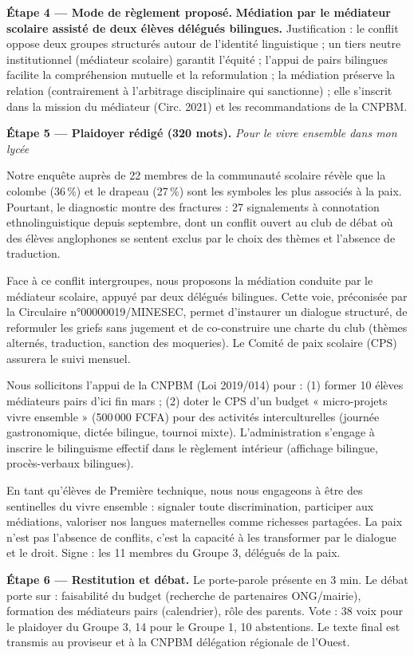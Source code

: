\documentclass[11pt]{article}
\begin{document}
\begin{exoresolu}
\textbf{Étape 4 — Mode de règlement proposé.} \textbf{Médiation par le médiateur scolaire assisté de deux élèves délégués bilingues.} Justification : le conflit oppose deux groupes structurés autour de l'identité linguistique ; un tiers neutre institutionnel (médiateur scolaire) garantit l'équité ; l'appui de pairs bilingues facilite la compréhension mutuelle et la reformulation ; la médiation préserve la relation (contrairement à l'arbitrage disciplinaire qui sanctionne) ; elle s'inscrit dans la mission du médiateur (Circ. 2021) et les recommandations de la CNPBM.

\textbf{Étape 5 — Plaidoyer rédigé (320 mots).}
\emph{Pour le vivre ensemble dans mon lycée}

Notre enquête auprès de 22 membres de la communauté scolaire révèle que la colombe (36\,\%) et le drapeau (27\,\%) sont les symboles les plus associés à la paix. Pourtant, le diagnostic montre des fractures : 27 signalements à connotation ethnolinguistique depuis septembre, dont un conflit ouvert au club de débat où des élèves anglophones se sentent exclus par le choix des thèmes et l'absence de traduction.

Face à ce conflit intergroupes, nous proposons la médiation conduite par le médiateur scolaire, appuyé par deux délégués bilingues. Cette voie, préconisée par la Circulaire n°00000019/MINESEC, permet d'instaurer un dialogue structuré, de reformuler les griefs sans jugement et de co-construire une charte du club (thèmes alternés, traduction, sanction des moqueries). Le Comité de paix scolaire (CPS) assurera le suivi mensuel.

Nous sollicitons l'appui de la CNPBM (Loi 2019/014) pour : (1) former 10 élèves médiateurs pairs d'ici fin mars ; (2) doter le CPS d'un budget « micro-projets vivre ensemble » (500\,000 FCFA) pour des activités interculturelles (journée gastronomique, dictée bilingue, tournoi mixte). L'administration s'engage à inscrire le bilinguisme effectif dans le règlement intérieur (affichage bilingue, procès-verbaux bilingues).

En tant qu'élèves de Première technique, nous nous engageons à être des sentinelles du vivre ensemble : signaler toute discrimination, participer aux médiations, valoriser nos langues maternelles comme richesses partagées. La paix n'est pas l'absence de conflits, c'est la capacité à les transformer par le dialogue et le droit. Signe : les 11 membres du Groupe 3, délégués de la paix.

\textbf{Étape 6 — Restitution et débat.} Le porte-parole présente en 3 min. Le débat porte sur : faisabilité du budget (recherche de partenaires ONG/mairie), formation des médiateurs pairs (calendrier), rôle des parents. Vote : 38 voix pour le plaidoyer du Groupe 3, 14 pour le Groupe 1, 10 abstentions. Le texte final est transmis au proviseur et à la CNPBM délégation régionale de l'Ouest.
\end{exoresolu}
\end{document}
